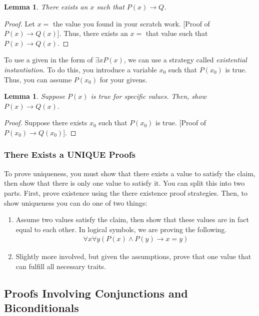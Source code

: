 \documentclass{article}
\newtheorem{lemma}[theorem]{Lemma}
\begin{document}
\begin{lemma}
    There exists an $x$ such that $P(x) \rightarrow Q$.
\end{lemma}
\begin{proof}
    Let $x =$ the value you found in your scratch work. [Proof of $P(x) \rightarrow Q(x)$]. Thus, there exists an $x = $ that value such that
    $P(x) \rightarrow Q(x)$.
\end{proof}

\noindent To use a given in the form of $\exists xP(x)$, we can use a strategy called \textit{existential instantiation}. To do this, you introduce a variable
$x_0$ such that $P(x_0)$ is true. Thus, you can assume $P(x_0)$ for your givens.

\begin{lemma}
    Suppose $P(x)$ is true for specific values. Then, show $P(x) \rightarrow Q(x)$.
\end{lemma}
\begin{proof}
    Suppose there exists $x_0$ such that $P(x_0)$ is true. [Proof of $P(x_0) \rightarrow Q(x_0)$].
\end{proof}

\subsubsection{There Exists a UNIQUE Proofs}
To prove uniqueness, you must show that there exists a value to satisfy the claim, then show that there is only one value to satisfy it. You can split
this into two parts. First, prove existence using the there existence proof strategies. Then, to show uniqueness you can do one of two things:
\begin{enumerate}
    \item Assume two values satisfy the claim, then show that these values are in fact equal to each other. In logical symbols, we are proving the 
            following.
            \begin{eqnarray*}
                \forall x \forall y (P(x) \land P(y) \rightarrow x = y)
            \end{eqnarray*}
    \item Slightly more involved, but given the assumptions, prove that one value that can fulfill all necessary traits.
\end{enumerate} 

\subsection{Proofs Involving Conjunctions and Biconditionals}
\end{document}
